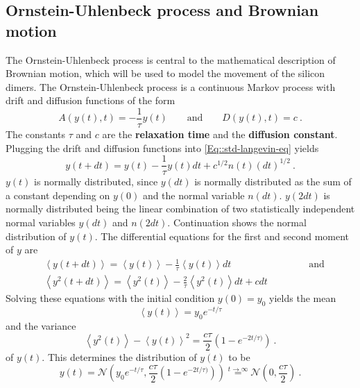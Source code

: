 	\subsection{Ornstein-Uhlenbeck process and Brownian motion} \label{Section::Brownian-Motion}
	The Ornstein-Uhlenbeck process is central to the mathematical description of Brownian motion, which will be used to model the movement of the silicon dimers. The Ornstein-Uhlenbeck process is a continuous Markov process with drift and diffusion functions of the form
	\begin{equation}
		A(y(t), t) =	- \frac{1}{\tau} y(t) \qquad \text{and} \qquad D(y(t), t) =	c~.
	\end{equation}
	The constants $\tau$ and $c$ are the \textbf{relaxation time} and the \textbf{diffusion constant}. Plugging the drift and diffusion functions into \autoref{Eq::std-langevin-eq} yields
	\begin{equation}\label{Eq::OU-Langevin}
		y(t + dt) =	y(t) - \frac{1}{\tau} y(t) dt + c^{1/2} n(t) (dt)^{1/2}~.
	\end{equation}
	$y(t)$ is normally distributed, since $y(dt)$ is normally distributed as the sum of a constant depending on $y(0)$ and the normal variable $n(dt)$. $y(2dt)$ is normally distributed being the linear combination of two statistically independent normal variables $y(dt)$ and $n(2dt)$. Continuation shows the normal distribution of $y(t)$.
	The differential equations for the first and second moment of $y$ are
	\begin{align}
		&\left \langle y(t + dt) \right \rangle =	\left \langle y(t) \right \rangle - \frac{1}{\tau} \left \langle y(t) \right \rangle dt \qquad \qquad \qquad \qquad  \text{and} \\
		&\left \langle y^2(t + dt) \right \rangle =	\left \langle y^2(t) \right \rangle - \frac{2}{\tau} \left \langle y^2(t) \right \rangle dt  + c dt
	\end{align}
	Solving these equations with the initial condition $y(0) =	y_0$ yields the mean
	\begin{equation}
		\left \langle y(t) \right \rangle =	 y_0 e^{-t/\tau}
	\end{equation}
	and the variance 
	\begin{equation}
		\left \langle y^2(t) \right \rangle - \left \langle y(t) \right \rangle^2 =	\frac{c\tau}{2} \left(1 - e^{-2t /	\tau)}\right)~.
	\end{equation}
	of $y(t)$. This determines the distribution of $y(t)$ to be
	\begin{equation} \label{Eq::OU-Distribution}
		y(t) =	\mathcal{N}\left(y_0 e^{-t/\tau}, \frac{c\tau}{2} \left(1 - e^{-2t /	\tau)}\right)\right) \overset{t \rightarrow \infty}{=} \mathcal{N}\left(0 , \frac{c\tau}{2}\right) ~.
	\end{equation}
